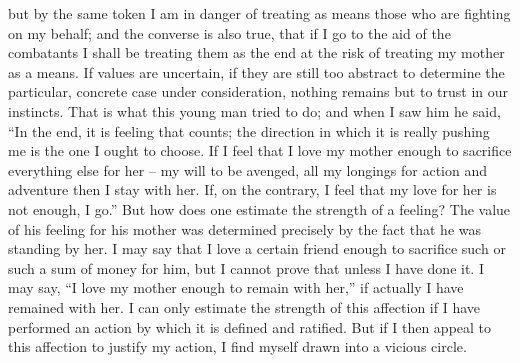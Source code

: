 \documentclass[12pt]{article}
\begin{document}
but by the same token I am in danger of treating as means those who are fighting on my behalf; and the converse is also true, that if I go to the aid of the combatants I shall be treating them as the end at the risk of treating my mother as a means. If values are uncertain, if they are still too abstract to determine the particular, concrete case under consideration, nothing remains but to trust in our instincts. That is what this young man tried to do; and when I saw him he said, “In the end, it is feeling that counts; the direction in which it is really pushing me is the one I ought to choose. If I feel that I love my mother enough to sacrifice everything else for her – my will to be avenged, all my longings for action and adventure then I stay with her. If, on the contrary, I feel that my love for her is not enough, I go.” But how does one estimate the strength of a feeling? The value of his feeling for his mother was determined precisely by the fact that he was standing by her. I may say that I love a certain friend enough to sacrifice such or such a sum of money for him, but I cannot prove that unless I have done it. I may say, “I love my mother enough to remain with her,” if actually I have remained with her. I can only estimate the strength of this affection if I have performed an action by which it is defined and ratified. But if I then appeal to this affection to justify my action, I find myself drawn into a vicious circle.
\end{document}
